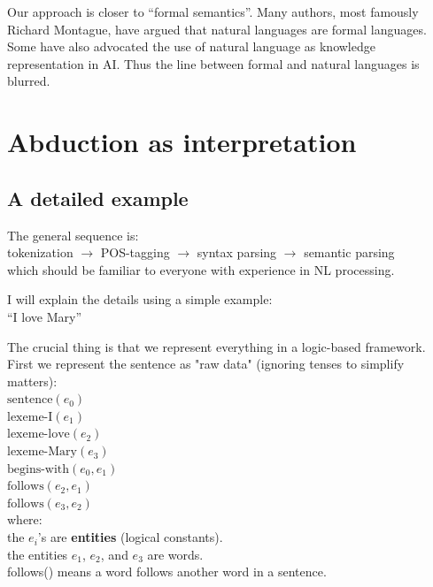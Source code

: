 Our approach is closer to ``formal semantics''.  Many authors, most famously Richard Montague, have argued that natural languages are formal languages.  Some have also advocated the use of natural language as knowledge representation in AI.  Thus the line between formal and natural languages is blurred.


\section{Abduction as interpretation}
\label{sec:abduction-as-interpretation}

\subsection{A detailed example}

The general sequence is:\\
\hspace*{1cm} tokenization $\rightarrow$ POS-tagging $\rightarrow$ syntax parsing $\rightarrow$ semantic parsing\\
which should be familiar to everyone with experience in NL processing.

I will explain the details using a simple example:\\
\hspace*{1cm} ``I love Mary''

The crucial thing is that we represent everything in a logic-based framework. First we represent the sentence as "raw data" (ignoring tenses to simplify matters):\\
\hspace*{1cm} $\mbox{sentence}(e_0)$\\
\hspace*{1cm} $\mbox{lexeme-I}(e_1)$\\
\hspace*{1cm} $\mbox{lexeme-love}(e_2)$\\
\hspace*{1cm} $\mbox{lexeme-Mary}(e_3)$\\
\hspace*{1cm} $\mbox{begins-with}(e_0, e_1)$\\
\hspace*{1cm} $\mbox{follows}(e_2, e_1)$\\
\hspace*{1cm} $\mbox{follows}(e_3, e_2)$\\
where:\\
\hspace*{1cm} the $e_i$'s are \textbf{entities} (logical constants).\\
\hspace*{1cm} the entities $e_1$, $e_2$, and $e_3$ are words.\\
\hspace*{1cm} follows() means a word follows another word in a sentence.

